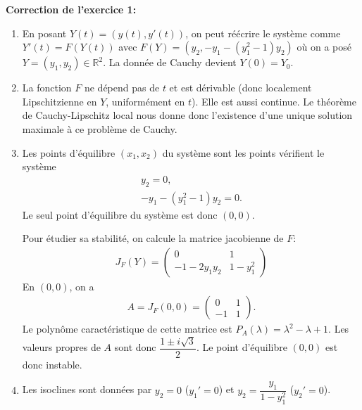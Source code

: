 \documentclass[11pt,a4paper]{article}
\newcommand{\R}{\mathbb R}
\begin{document}
\newpage

{\bf Correction de l'exercice 1:} \vspace{0.1cm}\\

\begin{enumerate}
\item En posant $Y(t) = (y(t) , y'(t))$, on peut r\'e\'ecrire le syst\`eme comme
  $Y'(t) = F(Y(t))$ avec $F(Y) = (y_2 , -y_1 - (y_1^2 - 1) y_2)$ o\`u
  on a pos\'e $Y = (y_1 , y_2) \in \R^2$.
  La donn\'ee de Cauchy devient $Y(0) = Y_0$.

\item La fonction $F$ ne d\'epend pas de $t$ et est d\'erivable
  (donc localement Lipschitzienne en $Y$, uniform\'ement en $t$). Elle est aussi continue.
  Le th\'eor\`eme de Cauchy-Lipschitz local nous donne donc l'existence d'une unique solution
  maximale \`a ce probl\`eme de Cauchy.

\item Les points d'\'equilibre $(x_1,x_2)$ du syst\`eme sont les points v\'erifient
  le syst\`eme
  \begin{align*}
    y_2 = 0 ,
    \\
    - y_1 - (y_1^2 - 1) y_2 = 0 .
  \end{align*}
  Le seul point d'\'equilibre du syst\`eme est donc $(0,0)$.

  Pour \'etudier sa stabilit\'e, on calcule la matrice jacobienne de $F$:
  \begin{align*}
    J_F(Y) =
    \begin{pmatrix}
      0 & 1
      \\
      -1-2y_1y_2 & 1-y_1^2
    \end{pmatrix}
  \end{align*}
  En $(0,0)$, on a
  \begin{align*}
    A = J_F(0,0) =
    \begin{pmatrix}
      0 & 1
      \\
      -1 & 1
    \end{pmatrix} .
  \end{align*}
  Le polyn\^ome caract\'eristique de cette matrice est
  $P_A(\lambda) = \lambda^2 - \lambda + 1$.
  Les valeurs propres de $A$ sont donc $\dfrac{1 \pm i \sqrt{3}}{2}$.
  Le point d'\'equilibre $(0,0)$ est donc instable.

\item Les isoclines sont donn\'ees par $y_2 = 0$ ($y_1' = 0$)
  et $y_2 = \dfrac{y_1}{1-y_1^2}$ ($y_2' = 0$).


\end{enumerate}
\end{document}
